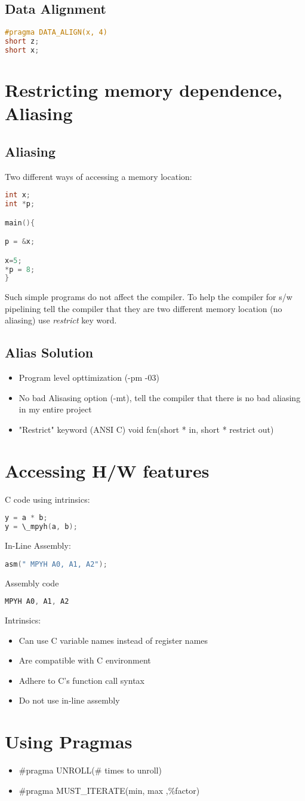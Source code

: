 \documentclass{article}
\begin{document}
\subsection{Data Alignment}
\begin{lstlisting}[language=C]
#pragma DATA_ALIGN(x, 4)
short z;
short x;
\end{lstlisting}
\section{Restricting memory dependence, Aliasing}

\subsection{Aliasing}
Two different ways of accessing a memory location:

\begin{lstlisting}[language=C]
int x;
int *p;

main(){

p = &x;

x=5;
*p = 8;
}
\end{lstlisting}
Such simple programs do not affect the compiler. To help the compiler
for s/w pipelining tell the compiler that they are two different
memory location (no aliasing) use \emph{restrict} key word.

\subsection{Alias Solution}
\begin{itemize}
\item Program level opttimization (-pm -03)
\item No bad Alisasing option (-mt), tell the compiler that there is
  no bad aliasing in my entire project
\item "Restrict" keyword (ANSI C) void fcn(short * in, short *
  restrict out)
\end{itemize}
\section{Accessing H/W features}
C code using intrinsics:
\begin{lstlisting}[language=C]
y = a * b;
y = \_mpyh(a, b);
\end{lstlisting}
In-Line Assembly:
\begin{lstlisting}[language=C]
asm(" MPYH A0, A1, A2");
\end{lstlisting}
Assembly code
\begin{lstlisting}[language=C]
MPYH A0, A1, A2
\end{lstlisting}
Intrinsics:
\begin{itemize}
\item Can use C variable names instead of register names
\item Are compatible with C environment
\item Adhere to C's function call syntax
\item Do not use in-line assembly
\end{itemize}
\section{Using Pragmas}
\begin{itemize}
\item \#pragma UNROLL(\# times to unroll)
\item \#pragma MUST\_ITERATE(min, max ,\%factor)
\end{itemize}
\end{document}

